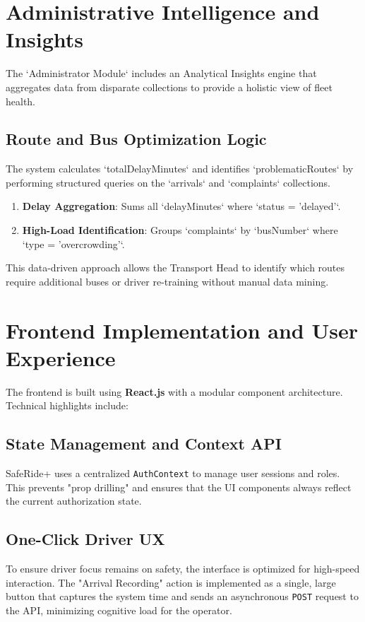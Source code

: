 \documentclass[conference]{IEEEtran}
\begin{document}
\section{Administrative Intelligence and Insights}
The `Administrator Module` includes an Analytical Insights engine that aggregates data from disparate collections to provide a holistic view of fleet health.

\subsection{Route and Bus Optimization Logic}
The system calculates `totalDelayMinutes` and identifies `problematicRoutes` by performing structured queries on the `arrivals` and `complaints` collections.
\begin{enumerate}
    \item \textbf{Delay Aggregation}: Sums all `delayMinutes` where `status = 'delayed'`.
    \item \textbf{High-Load Identification}: Groups `complaints` by `busNumber` where `type = 'overcrowding'`.
\end{enumerate}
This data-driven approach allows the Transport Head to identify which routes require additional buses or driver re-training without manual data mining.

\section{Frontend Implementation and User Experience}
The frontend is built using \textbf{React.js} with a modular component architecture. Technical highlights include:

\subsection{State Management and Context API}
SafeRide+ uses a centralized \texttt{AuthContext} to manage user sessions and roles. This prevents "prop drilling" and ensures that the UI components always reflect the current authorization state. 

\subsection{One-Click Driver UX}
To ensure driver focus remains on safety, the interface is optimized for high-speed interaction. The "Arrival Recording" action is implemented as a single, large button that captures the system time and sends an asynchronous \texttt{POST} request to the API, minimizing cognitive load for the operator.
\end{document}
